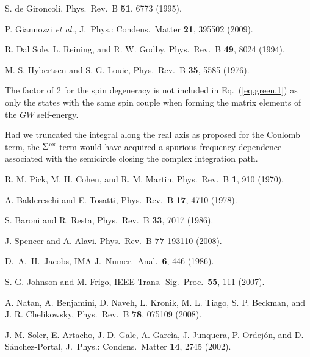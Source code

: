 \documentclass[twocolumn,prb,showpacs,superscriptaddress]{revtex4}
\begin{document}
\begin{thebibliography}{99}
S. de Gironcoli,
Phys.\ Rev.\ B {\bf 51}, 6773 (1995).

P. Giannozzi {\it et al.},
J.\ Phys.: Condens.\ Matter {\bf 21}, 395502 (2009).

R. Dal Sole, L. Reining, and R. W. Godby,
Phys.\ Rev.\ B {\bf 49}, 8024 (1994).

M. S. Hybertsen and S. G. Louie,
Phys.\ Rev.\ B {\bf 35}, 5585 (1976).

The factor of 2 for the spin degeneracy is not included in Eq.\ (\ref{eq.green.1})
as only the states with the same spin couple when forming the 
matrix elements of the $GW$ self-energy.\cite{hl86}

Had we truncated the integral along the real axis as proposed for the Coulomb term, 
the $\Sigma^{\rm ex}$ term would have acquired a spurious frequency dependence associated with
the semicircle closing the complex integration path.

R. M. Pick, M. H. Cohen, and R. M. Martin,
Phys.\ Rev.\ B {\bf 1}, 910 (1970). 

A. Baldereschi and E. Tosatti,
Phys.\ Rev.\ B {\bf 17}, 4710 (1978).

S. Baroni and R. Resta,
Phys.\ Rev.\ B {\bf 33}, 7017 (1986).

J. Spencer and A. Alavi.
Phys.\ Rev.\ B {\bf 77} 193110 (2008).

D.\ A.\ H.\ Jacobs,
IMA J.\ Numer.\ Anal.\ {\bf 6}, 446 (1986).

S. G. Johnson and M. Frigo,
IEEE Trans.\ Sig.\ Proc.\ {\bf 55}, 111 (2007).

A. Natan, A. Benjamini, D. Naveh, L. Kronik, M. L. Tiago, S. P. Beckman, and J. R. Chelikowsky,
Phys.\ Rev.\ B {\bf 78}, 075109 (2008).

J. M. Soler, E. Artacho, J. D. Gale, A. Garc\`ia, J. Junquera, P. Ordej\'on, and D. S\'anchez-Portal,
J.\ Phys.: Condens.\ Matter {\bf 14}, 2745 (2002).


\end{thebibliography}
\end{document}
